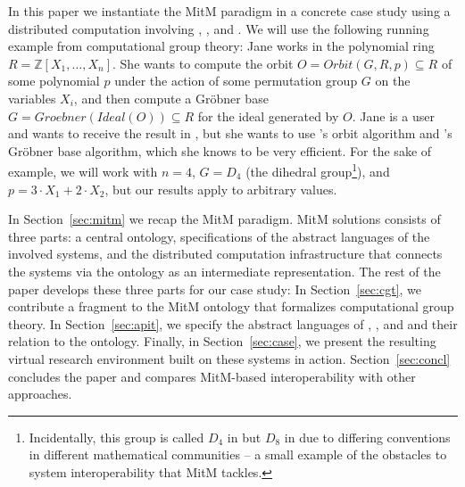In this paper we instantiate the MitM paradigm in a concrete case study using a distributed computation involving \GAP, \Sage, and \Singular.
We will use the following running example from computational group theory: Jane works in the polynomial ring $R=\mathbb{Z}[X_1,\ldots,X_n]$.
She wants to compute the orbit $O=Orbit(G,R,p)\subseteq R$ of some polynomial $p$ under the action of some permutation group $G$ on the variables $X_i$, and then compute a Gr\"obner base $G=Groebner(Ideal(O))\subseteq R$ for the ideal generated by $O$.
Jane is a \Sage user and wants to receive the result in \Sage, but she wants to use \GAP's orbit algorithm and \Singular's Gr\"obner base algorithm, which she knows to be very efficient.
For the sake of example, we will work with $n=4$, $G=D_4$ (the dihedral group\footnote{Incidentally, this group is called $D_4$ in \Sage but $D_8$ in \GAP due to differing conventions in different mathematical communities -- a small example of the obstacles to system interoperability that MitM tackles.}), and $p=3\cdot X_1+2\cdot X_2$, but our results apply to arbitrary values.

In Section~\ref{sec:mitm} we recap the MitM paradigm.
MitM solutions consists of three parts: a central ontology, specifications of the abstract languages of the involved systems, and the distributed computation infrastructure that connects the systems via the ontology as an intermediate representation.
The rest of the paper develops these three parts for our case study:
In Section~\ref{sec:cgt}, we contribute a fragment to the MitM ontology that formalizes computational group theory.
In Section~\ref{sec:apit}, we specify the abstract languages of \GAP, \Sage, and \Singular and their relation to the ontology.
Finally, in Section~\ref{sec:case}, we present the resulting virtual research environment built on these systems in action.
Section~\ref{sec:concl} concludes the paper and compares MitM-based interoperability with other approaches.


